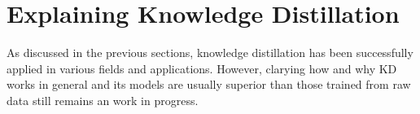 \section{Explaining Knowledge Distillation}
As discussed in the previous sections, knowledge distillation has been successfully applied in various fields and applications. However, clarying how and why KD works in general and its models are usually superior than those trained from raw data still remains an work in progress.